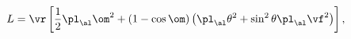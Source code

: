 \begin{equation}                                        \label{elalth}
  L=\vr\left[\frac12\pl_\al\om^2
  +(1-\cos\om)\left(\pl_\al\theta^2+\sin^2\theta\pl_\al\vf^2\right)\right],
\end{equation}

